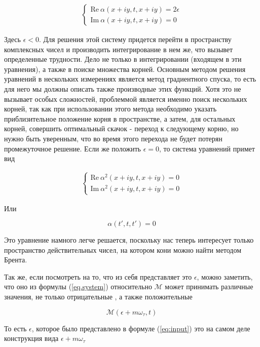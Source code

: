 \documentclass[14pt]{extarticle}
\renewcommand{\Re}{\mathrm{Re}}
\renewcommand{\Im}{\mathrm{Im}}
\newcommand{\cM}{\mathcal{M}}
\renewcommand{\Re}{\mathrm{Re}}
\renewcommand{\Im}{\mathrm{Im}}
\begin{document}
\begin{eqnarray}
\begin{cases}
\Re \ \alpha(x+i y, t, x+i y) = 2\epsilon \nonumber\\
\Im \ \alpha(x+i y, t, x+i y) = 0 \nonumber
\end{cases}
\end{eqnarray}

Здесь $\epsilon < 0$. Для решения этой систему придется перейти в пространству комплексных чисел и производить интегрирование в нем же, что вызывет определенные трудности. Дело не только в интегрировании (входящем в эти уравнения), а также в поиске множества корней. Основным методом решения уравнений в нескольких измерениях является метод градиентного спуска, то есть для него мы должны описать также производные этих функций. Хотя это не вызывает особых сложностей, проблеммой является именно поиск нескольких корней, так как при использовании этого метода необходимо указать приблизительное положение корня в пространстве, а затем, для остальных корней, совершить оптимальный скачок - переход к следующему корню, но нужно быть уверенным, что во время этого перехода не будет потерян промежуточное решение.
Если же положить $ \epsilon = 0$, то система уравнений примет вид 

\begin{eqnarray}
\begin{cases}
\Re \ \alpha^2(x+i y, t, x+i y) = 0 \nonumber\\
\Im \ \alpha^2(x+i y, t, x+i y) = 0 \nonumber
\end{cases}
\end{eqnarray}

Или 

\begin{equation}
\alpha(t', t, t') = 0
\end{equation}

Это уравнение намного легче решается, поскольку нас теперь интересует только пространство действительных чисел, на котором кони можно найти методом Брента.

Так же, если посмотреть на то, что из себя представляет это $\epsilon$, можно заметить, что оно из формулы (\ref{eq.system}) относительно $\cM$ может принимать различные значения, не только отрицательные , а также положительные 

$$
\cM(\epsilon+m\omega_\tau,t)
$$

То есть $\epsilon$, которое было представлено в формуле (\ref{eq:input}) это на самом деле конструкция вида $\epsilon+m\omega_\tau$
\end{document}
